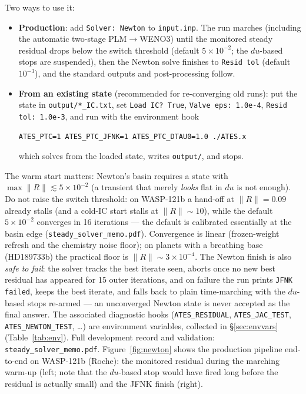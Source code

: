 \documentclass[english,a4paper]{kiseon_memo}
\begin{document}
Two ways to use it:
\begin{itemize}
\item \textbf{Production}: add \texttt{Solver: Newton} to \texttt{input.inp}. The
  run marches (including the automatic two-stage PLM$\to$WENO3) until the
  monitored steady residual drops below the switch threshold (default
  $5\times10^{-2}$; the $du$-based stops are suspended), then the Newton solve
  finishes to \texttt{Resid tol} (default $10^{-3}$), and the standard outputs and
  post-processing follow.
\item \textbf{From an existing state} (recommended for re-converging old runs):
  put the state in \texttt{output/*\_IC.txt}, set \texttt{Load IC?\ True},
  \texttt{Valve eps:\ 1.0e-4}, \texttt{Resid tol:\ 1.0e-3}, and run with the
  environment hook
\begin{lstlisting}[style=sh]
ATES_PTC=1 ATES_PTC_JFNK=1 ATES_PTC_DTAU0=1.0 ./ATES.x
\end{lstlisting}
  which solves from the loaded state, writes \texttt{output/}, and stops.
\end{itemize}
The warm start matters: Newton's basin requires a state with
$\max\|R\|\lesssim5\times10^{-2}$ (a transient that merely \emph{looks} flat in
$du$ is not enough). Do not raise the switch threshold: on WASP-121b a
hand-off at $\|R\|=0.09$ already stalls (and a cold-IC start stalls at
$\|R\|\sim10$), while the default $5\times10^{-2}$ converges in 16
iterations --- the default is calibrated essentially at the basin edge
(\texttt{steady\_solver\_memo.pdf}). Convergence is linear (frozen-weight refresh and the
chemistry noise floor); on planets with a breathing base (HD189733b) the
practical floor is $\|R\|\sim3\times10^{-4}$.
The Newton finish is also \emph{safe to fail}: the solver tracks the best
iterate seen, aborts once no new best residual has appeared for 15 outer
iterations, and on failure the run prints \texttt{JFNK failed}, keeps the best
iterate, and falls back to plain time-marching with the $du$-based stops
re-armed --- an unconverged Newton state is never accepted as the final
answer. The associated diagnostic hooks (\texttt{ATES\_RESIDUAL},
\texttt{ATES\_JAC\_TEST}, \texttt{ATES\_NEWTON\_TEST}, \ldots) are environment
variables, collected in \S\ref{sec:envvars} (Table~\ref{tab:env}). Full
development record and validation: \texttt{steady\_solver\_memo.pdf}.
Figure~\ref{fig:newton} shows the production pipeline end-to-end on WASP-121b
(Roche): the monitored residual during the marching warm-up (left; note that the
$du$-based stop would have fired long before the residual is actually small) and
the JFNK finish (right).
\end{document}
